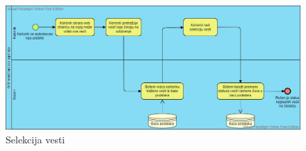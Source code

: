 \documentclass{article}
\begin{document}
\begin{figure}[htbp!]
    \centering
    \includegraphics[scale=0.35]{Selekcija_vesti.jpg}
    \caption{Selekcija vesti}
    \label{slk:dtp}
\end{figure}
\end{document}
